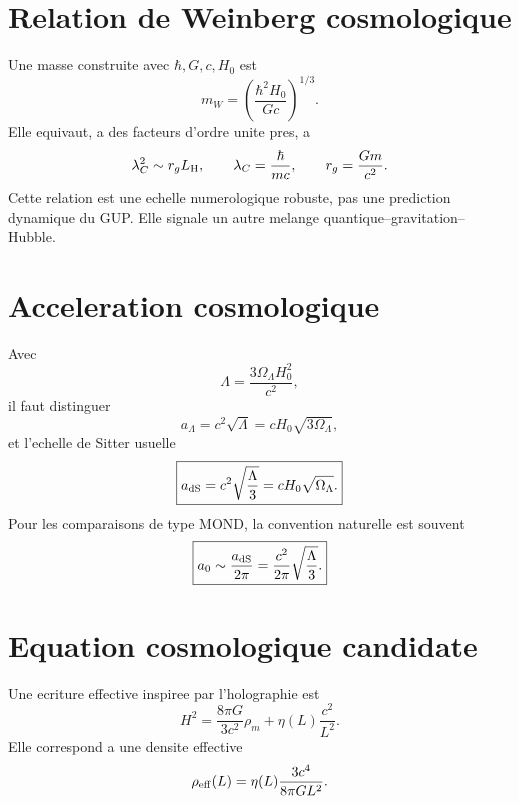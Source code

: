 \documentclass[11pt,a4paper]{article}
\newcommand{\LH}{L_{\rm H}}
\begin{document}
\section{Relation de Weinberg cosmologique}

Une masse construite avec $\hbar,G,c,H_0$ est
\begin{equation}
\boxed{
m_W=\left(\frac{\hbar^2H_0}{Gc}\right)^{1/3}.
}
\label{eq:weinberg_mass}
\end{equation}
Elle equivaut, a des facteurs d'ordre unite pres, a
\begin{equation}
\lambda_C^2\sim r_g\LH,
\qquad
\lambda_C=\frac{\hbar}{mc},
\qquad
r_g=\frac{Gm}{c^2}.
\end{equation}
Cette relation est une echelle numerologique robuste, pas une prediction
dynamique du GUP. Elle signale un autre melange quantique--gravitation--Hubble.

\section{Acceleration cosmologique}

Avec
\begin{equation}
\Lambda=\frac{3\Omega_\Lambda H_0^2}{c^2},
\end{equation}
il faut distinguer
\begin{equation}
\boxed{
a_\Lambda=c^2\sqrt{\Lambda}
=cH_0\sqrt{3\Omega_\Lambda},
}
\end{equation}
et l'echelle de Sitter usuelle
\begin{equation}
\boxed{
a_{\rm dS}=c^2\sqrt{\frac{\Lambda}{3}}
=cH_0\sqrt{\Omega_\Lambda}.
}
\end{equation}
Pour les comparaisons de type MOND, la convention naturelle est souvent
\begin{equation}
\boxed{
a_0\sim\frac{a_{\rm dS}}{2\pi}
=
\frac{c^2}{2\pi}\sqrt{\frac{\Lambda}{3}}.
}
\end{equation}

\section{Equation cosmologique candidate}

Une ecriture effective inspiree par l'holographie est
\begin{equation}
\boxed{
H^2
=
\frac{8\pi G}{3c^2}\rho_m
+\eta(L)\frac{c^2}{L^2}.
}
\label{eq:friedmann_candidate}
\end{equation}
Elle correspond a une densite effective
\begin{equation}
\rho_{\rm eff}(L)
=
\eta(L)\frac{3c^4}{8\pi G L^2}.
\end{equation}
\end{document}
